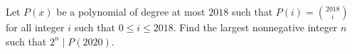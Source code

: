 Let $P(x)$ be a polynomial of degree at most $2018$ such that $P(i)=\binom{2018}i$ for all integer $i$ such that $0\le i\le 2018$. Find the largest nonnegative integer $n$ such that $2^n\mid P(2020)$.
